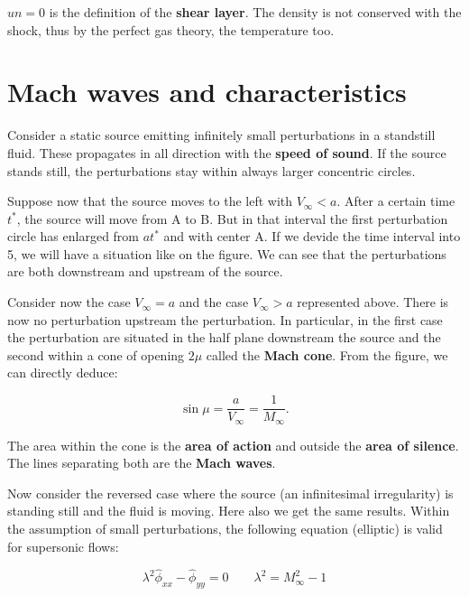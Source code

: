 	$un = 0$ is the definition of the \textbf{shear layer}. The density is not conserved with the shock, thus by the perfect gas theory, the temperature too. 
	
\section{Mach waves and characteristics}
	Consider a static source emitting infinitely small perturbations in a standstill fluid. These propagates in all direction with the \textbf{speed of sound}. If the source stands still, the perturbations stay within always larger concentric circles. 
	
	Suppose now that the source moves to the left with $V_\infty < a$. After a certain time $t^*$, the source will move from A to B. But in that interval the first perturbation circle has enlarged from $at^*$ and with center A. If we devide the time interval into 5, we will have a situation like on the figure. We can see that the perturbations are both downstream and upstream of the source.  

	
	Consider now the case $V_\infty = a$ and the case $V_\infty > a$ represented above. There is now no perturbation upstream the perturbation. In particular, in the first case the perturbation are situated in the half plane downstream the source and the second within a cone of opening $2\mu$ called the \textbf{Mach cone}. From the figure, we can directly deduce: 
	
	\begin{equation}
	\sin \mu = \frac{a}{V_\infty} = \frac{1}{M_\infty}.
	\end{equation}
	
	The area within the cone is the \textbf{area of action} and outside the \textbf{area of silence}. The lines separating both are the \textbf{Mach waves}. 
	
	Now consider the reversed case where the source (an infinitesimal irregularity) is standing still and the fluid is moving. Here also we get the same results. Within the assumption of small perturbations, the following equation (elliptic) is valid for supersonic flows: 
	
	\begin{equation}
	\lambda ^2 \hat{\phi} _{xx} - \hat{\phi}_{yy} = 0 \qquad \lambda ^2 = M_\infty ^2 -1
	\end{equation}
	
